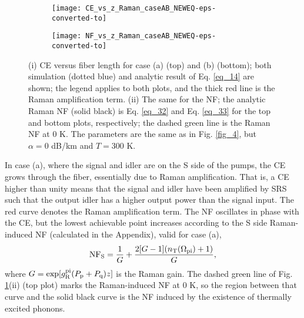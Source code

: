 \documentclass[10pt,letterpaper]{article}
\begin{document}
\begin{figure}[!t]
\centering \begin{subfigure}[i]{0.49\linewidth}  \centering
\texttt{[image: CE\_vs\_z\_Raman\_caseAB\_NEWEQ-eps-converted-to]}
\caption{ }
\end{subfigure} 
\begin{subfigure}{0.49\linewidth}  \centering
\texttt{[image: NF\_vs\_z\_Raman\_caseAB\_NEWEQ-eps-converted-to]}
\caption{ }
\end{subfigure}\vspace{-0.25cm}
\caption{(i) CE versus fiber length for case (a) (top) and (b) (bottom); both simulation (dotted blue) and analytic result of Eq. \eqref{eq_14} are shown; the legend applies to both plots, and the thick red line is the Raman amplification term. (ii) The same for the NF; the analytic Raman NF (solid black) is Eq. \eqref{eq_32} and Eq. \eqref{eq_33} for the top and bottom plots, respectively; the dashed green line is the Raman NF at 0 K. The parameters are the same as in Fig. \ref{fig_4}, but $\alpha= 0$ dB/km and $T = 300$ K.} 
\label{fig_5}
\end{figure}

In case (a), where the signal and idler are on the S side of the pumps, the CE grows through the fiber, essentially due to Raman amplification. That is, a CE higher than unity means that the signal and idler have been amplified by SRS such that the output idler has a higher output power than the signal input. The red curve denotes the Raman amplification term. The NF oscillates in phase with the CE, but the lowest achievable point increases according to the S side Raman-induced NF (calculated in the Appendix), valid for case (a),
\begin{eqnarray} \label{eq_32}
{\rm NF_{\rm S}} = \frac{1}{G}+ \frac{2[G-1](n_{\rm T}(\Omega_{\rm pi})+1)}{G},
\end{eqnarray}
where $G = \exp[g_{\rm R}^{\rm pi}(P_{\rm p}+P_{\rm q})z]$ is the Raman gain.
The dashed green line of Fig. \ref{fig_5}(ii) (top plot) marks the Raman-induced NF at 0 K, so the region between that curve and the solid black curve is the NF induced by the existence of thermally excited phonons. %
\end{document}
